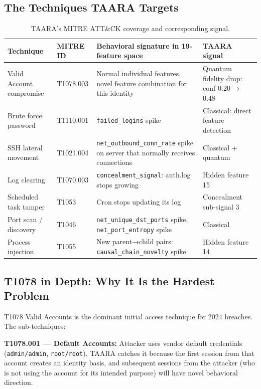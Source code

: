 \documentclass[11pt,a4paper]{article}
\begin{document}
\subsection{The Techniques TAARA Targets}

\begin{table}[H]
\centering\small
\begin{tabular}{@{}p{4.5cm}p{2.5cm}p{4cm}p{3cm}@{}}
\toprule
Technique & MITRE ID & Behavioral signature in 19-feature space & TAARA signal \\
\midrule
Valid Account compromise & T1078.003 & Normal individual features, novel feature combination for this identity & Quantum fidelity drop: conf 0.20 → 0.48 \\
Brute force password & T1110.001 & \texttt{failed\_logins} spike & Classical: direct feature detection \\
SSH lateral movement & T1021.004 & \texttt{net\_outbound\_conn\_rate} spike on server that normally receives connections & Classical + quantum \\
Log clearing & T1070.003 & \texttt{concealment\_signal}: auth.log stops growing & Hidden feature 15 \\
Scheduled task tamper & T1053 & Cron stops updating its log & Concealment sub-signal 3 \\
Port scan / discovery & T1046 & \texttt{net\_unique\_dst\_ports} spike, \texttt{net\_port\_entropy} spike & Classical \\
Process injection & T1055 & New parent→child pairs: \texttt{causal\_chain\_novelty} spike & Hidden feature 14 \\
\bottomrule
\end{tabular}
\caption{TAARA's MITRE ATT\&CK coverage and corresponding signal.}
\end{table}

\subsection{T1078 in Depth: Why It Is the Hardest Problem}

T1078 Valid Accounts is the dominant initial access technique for 2024 breaches. The sub-techniques:

\textbf{T1078.001 — Default Accounts:} Attacker uses vendor default credentials (\texttt{admin/admin}, \texttt{root/root}). TAARA catches it because the first session from that account creates an identity basis, and subsequent sessions from the attacker (who is not using the account for its intended purpose) will have novel behavioral direction.
\end{document}
